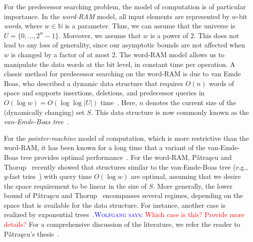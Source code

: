 \documentclass[a4paper,11pt]{article}
\newcommand{\N}{\mathbb{N}}
\newcommand{\?}{\mskip1.5mu}
\newcommand{\Patrascu}{P\v{a}tra\c{s}cu\xspace}
\newcommand{\aremark}[3]{\textcolor{blue}{\textsc{#1 #2:}}
  \textcolor{red}{\textsf{#3}}}
\newcommand{\wolfgang}[2][says]{\aremark{Wolfgang}{#1}{#2}}
\begin{document}
For the predecessor searching problem, the model 
of computation is of particular importance. In 
the \emph{word-RAM} model, all input elements 
are represented by $w$-bit \emph{words}, where 
$w \in \N$ is a parameter. Thus, we can assume 
that the universe is $U = \{0, \dots, 2^{w}-1\}$. 
Moreover, we assume that $w$ 
is a power of $2$. This does not lead to any 
loss of generality, since our asymptotic bounds 
are not affected when $w$ is changed by a factor of 
at most $2$. The word-RAM model allows us to 
manipulate the data words at the bit level, 
in constant time per operation. A classic 
method for predecessor searching on the 
word-RAM is due to van Emde Boas, who described 
a dynamic data structure that requires $O(n)$ words
of space and supports insertions, deletions, and 
predecessor queries in 
$O(\log w) = O(\log\log |U|)$ 
time~\cite{vEmdeBoas77,vEmdeBoasKaZi76,CormenLeRiSt09}.
Here, $n$ denotes the current size of the
(dynamically changing) set $S$. This data 
structure is now commonly known as the 
\emph{van-Emde-Boas tree}~\cite{CormenLeRiSt09}.

For the \emph{pointer-machine} model of computation, 
which is more restrictive than the word-RAM, it has 
been known for a long time that a variant of the 
van-Emde-Boas tree provides optimal 
performance~\cite{MehlhornNaAl88,Mulzer09}.
For the word-RAM, \Patrascu and Thorup~\cite{PatrascuTh06,PatrascuTh07} 
recently showed that structures similar to the 
van-Emde-Boas tree (e.g., $y$-fast tries~\cite{Willard83}) 
with query time $O(\log w)$ are optimal, assuming that 
we desire the space requirement to be linear in the 
size of $S$. More generally, the lower bound of 
\Patrascu and Thorup~\cite{PatrascuTh06,PatrascuTh07} 
encompasses several regimes, depending on the 
space that is available for the data structure.
For instance, another case is realized by exponential 
trees~\cite{AnderssonTh07}.\wolfgang{Which case is this?
Provide more details?} 
For a comprehensive discussion of the literature, we refer
the reader to \Patrascu's thesis~\cite{Patrascu08}.
\end{document}
